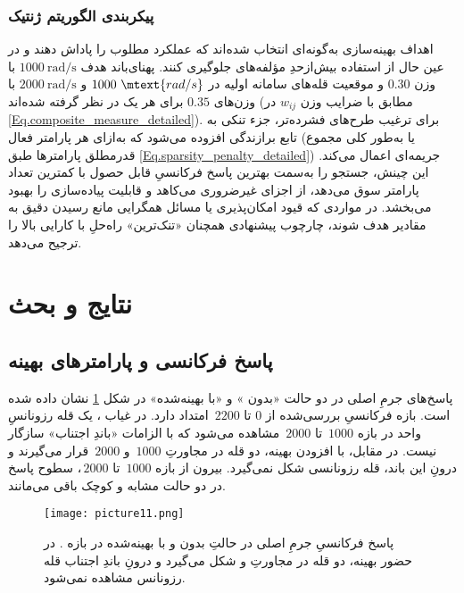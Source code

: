 \subsubsection{پیکربندی الگوریتم ژنتیک}

اهداف بهینه‌سازی به‌گونه‌ای انتخاب شده‌اند که عملکرد مطلوب را پاداش دهند و در عین حال از استفاده بیش‌ازحدِ مؤلفه‌های  جلوگیری کنند. پهنای‌باند هدف $1000~\text{rad/s}$ با وزن $0.30$ و موقعیت قله‌های سامانه اولیه در $1000~\mtext{rad/s}$ و $2000~\text{rad/s}$ با وزن‌های $0.35$ برای هر یک در نظر گرفته شده‌اند (مطابق با ضرایب وزن $w_{ij}$ در \eqref{Eq.composite_measure_detailed}). برای ترغیب طرح‌های فشرده‌تر، جزء تنکی به تابع برازندگی افزوده می‌شود که به‌ازای هر پارامتر فعال  (یا به‌طور کلی مجموع قدرمطلق پارامترها طبق \eqref{Eq.sparsity_penalty_detailed}) جریمه‌ای اعمال می‌کند. این چینش، جستجو را به‌سمت بهترین پاسخ فرکانسیِ قابل حصول با کمترین تعداد پارامتر سوق می‌دهد، از اجزای غیرضروری می‌کاهد و قابلیت پیاده‌سازی را بهبود می‌بخشد. در مواردی که قیود امکان‌پذیری یا مسائل همگرایی مانع رسیدن دقیق به مقادیر هدف شوند، چارچوب پیشنهادی همچنان «تنک‌ترین» راه‌حلِ با کارایی بالا را ترجیح می‌دهد.

\section{نتایج و بحث}
\subsection{پاسخ فرکانسی و پارامترهای بهینه }

پاسخ‌های  جرمِ اصلی در دو حالت «بدون » و «با  بهینه‌شده» در شکل \ref{fig:frf_comparison} نشان داده شده است. بازه فرکانسیِ بررسی‌شده از \(0\) تا \(2200\)\, امتداد دارد. در غیاب ، یک قله رزونانسِ واحد در بازه \(1000\)\, تا \(2000\)\, مشاهده می‌شود که با الزامات «باندِ اجتناب» سازگار نیست. در مقابل، با افزودن  بهینه، دو قله در مجاورتِ \(1000\)\, و \(2000\)\, قرار می‌گیرند و درونِ این باند، قله رزونانسی شکل نمی‌گیرد. بیرون از بازه \(1000\)\, تا \(2000\)\,، سطوح پاسخ در دو حالت مشابه و کوچک باقی می‌مانند.

\begin{figure}[htbp]
  \centering
  \texttt{[image: picture11.png]}%
  \caption{پاسخ فرکانسیِ جرمِ اصلی در حالتِ بدون  و با  بهینه‌شده در بازه . در حضور  بهینه، دو قله در مجاورتِ  و  شکل می‌گیرد و درونِ باندِ اجتناب قله رزونانس مشاهده نمی‌شود.}
  \label{fig:frf_comparison}
\end{figure}

